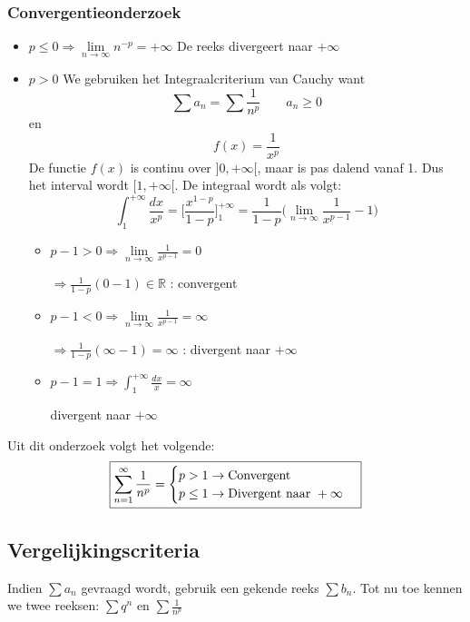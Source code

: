 \subsubsection{Convergentieonderzoek}
\begin{itemize}
    \item $p \leq 0 \Rightarrow \lim\limits_{n\to\infty} n^{-p} = +\infty$
        De reeks divergeert naar $+\infty$
    \item $p > 0$
        We gebruiken het Integraalcriterium van Cauchy want
        $$\sum a_n = \sum \frac{1}{n^p} \qquad a_n \geq 0$$
        en
        $$f(x) = \frac{1}{x^p}$$
        De functie $f(x)$ is continu over $]0, +\infty[$, maar is pas dalend vanaf 1. Dus het interval wordt $[1, +\infty[$. De integraal wordt als volgt:
        $$\int_{1}^{+\infty} \frac{dx}{x^p} = \bigg[\frac{x^{1 - p}}{1 - p}\bigg]_1^{+\infty} = \frac{1}{1 - p}\bigg(\lim\limits_{n\to\infty}\frac{1}{x^{p-1}} - 1\bigg)$$
        \begin{itemize}[label={als}]
            \item $p - 1 > 0 \Rightarrow \lim\limits_{n\to\infty}\frac{1}{x^{p-1}} = 0$
                    
                    $\Rightarrow \frac{1}{1 - p}(0 - 1) \in \mathbb{R}$ : convergent
                    
            \item $p - 1 < 0 \Rightarrow \lim\limits_{n\to\infty}\frac{1}{x^{p-1}} = \infty$
            
                    $\Rightarrow \frac{1}{1 - p}(\infty - 1) = \infty$ : divergent naar $+\infty$
            
            \item $p - 1 = 1 \Rightarrow \int_1^{+\infty} \frac{dx}{x} = \infty$
            
                divergent naar $+\infty$
        \end{itemize}
        
\end{itemize}
Uit dit onderzoek volgt het volgende:
$$
\boxed{
    \sum_{n = 1}^{\infty} \frac{1}{n^p} = \begin{cases}
                            p > 1 \rightarrow \hbox{Convergent} \\
                            p \leq 1 \rightarrow \hbox{Divergent naar } +\infty \\
                            \end{cases}
}
$$
\subsection{Vergelijkingscriteria}
Indien $\sum a_n$ gevraagd wordt, gebruik een gekende reeks $\sum b_n$. Tot nu toe kennen we twee reeksen: $\sum q^n$ en $\sum \frac{1}{n^p}$


